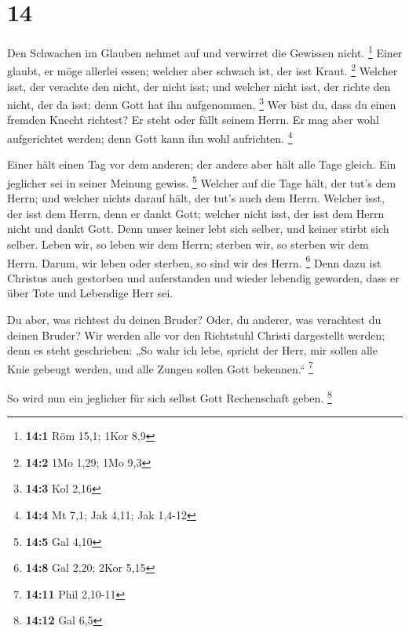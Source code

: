 \hypertarget{section-4}{%
\section{14}\label{section-4}}

 Den Schwachen im Glauben nehmet auf und verwirret die
Gewissen nicht. \footnote{\textbf{14:1} Röm 15,1; 1Kor 8,9}
 Einer glaubt, er möge allerlei essen; welcher aber
schwach ist, der isst Kraut. \footnote{\textbf{14:2} 1Mo 1,29; 1Mo 9,3}
 Welcher isst, der verachte den nicht, der nicht isst; und
welcher nicht isst, der richte den nicht, der da isst; denn Gott hat ihn
aufgenommen. \footnote{\textbf{14:3} Kol 2,16}  Wer bist
du, dass du einen fremden Knecht richtest? Er steht oder fällt seinem
Herrn. Er mag aber wohl aufgerichtet werden; denn Gott kann ihn wohl
aufrichten. \footnote{\textbf{14:4} Mt 7,1; Jak 4,11; Jak 1,4-12}

 Einer hält einen Tag vor dem anderen; der andere aber
hält alle Tage gleich. Ein jeglicher sei in seiner Meinung gewiss.
\footnote{\textbf{14:5} Gal 4,10}  Welcher auf die Tage
hält, der tut's dem Herrn; und welcher nichts darauf hält, der tut's
auch dem Herrn. Welcher isst, der isst dem Herrn, denn er dankt Gott;
welcher nicht isst, der isst dem Herrn nicht und dankt Gott.
 Denn unser keiner lebt sich selber, und keiner stirbt
sich selber.  Leben wir, so leben wir dem Herrn; sterben
wir, so sterben wir dem Herrn. Darum, wir leben oder sterben, so sind
wir des Herrn. \footnote{\textbf{14:8} Gal 2,20; 2Kor 5,15}
 Denn dazu ist Christus auch gestorben und auferstanden
und wieder lebendig geworden, dass er über Tote und Lebendige Herr sei.

 Du aber, was richtest du deinen Bruder? Oder, du
anderer, was verachtest du deinen Bruder? Wir werden alle vor den
Richtstuhl Christi dargestellt werden;  denn es steht
geschrieben: „So wahr ich lebe, spricht der Herr, mir sollen alle Knie
gebeugt werden, und alle Zungen sollen Gott bekennen.`` \footnote{\textbf{14:11}
  Phil 2,10-11}

 So wird nun ein jeglicher für sich selbst Gott
Rechenschaft geben. \footnote{\textbf{14:12} Gal 6,5}

